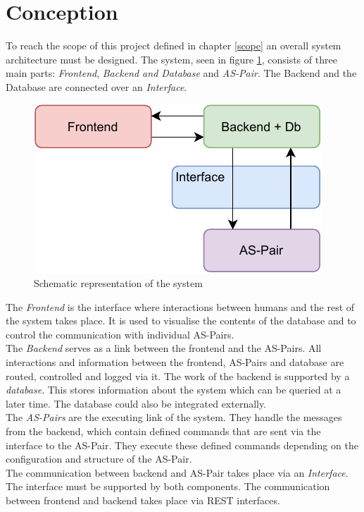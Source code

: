 \section{Conception}\label{concept}

To reach the scope of this project defined in chapter \ref{scope} an overall system architecture must be designed. The system, seen in figure \ref{fig:fist_conc_system}, consists of three main parts: \textit{Frontend}, \textit{Backend and Database} and \textit{AS-Pair}. The Backend and the Database are connected over an \textit{Interface}.\\

\begin{figure}[H]
    \centering
    \includegraphics[width=.5\textwidth]{images/4_1/first_concept_ansicht.pdf}
    \caption{Schematic representation of the system}
    \label{fig:fist_conc_system}
\end{figure}

The \textit{Frontend} is the interface where interactions between humans and the rest of the system takes place. It is used to visualise the contents of the database and to control the communication with individual AS-Pairs.\\

The \textit{Backend} serves as a link between the frontend and the AS-Pairs. All interactions and information between the frontend, AS-Pairs and database are routed, controlled and logged via it. The work of the backend is supported by a \textit{database}. This stores information about the system which can be queried at a later time. The database could also be integrated externally.\\

The \textit{AS-Pairs} are the executing link of the system. They handle the messages from the backend, which contain defined commands that are sent via the interface to the AS-Pair. They execute these defined commands depending on the configuration and structure of the AS-Pair.\\

The communication between backend and AS-Pair takes place via an \textit{Interface}. The interface must be supported by both components. The communication between frontend and backend takes place via REST interfaces.\\

